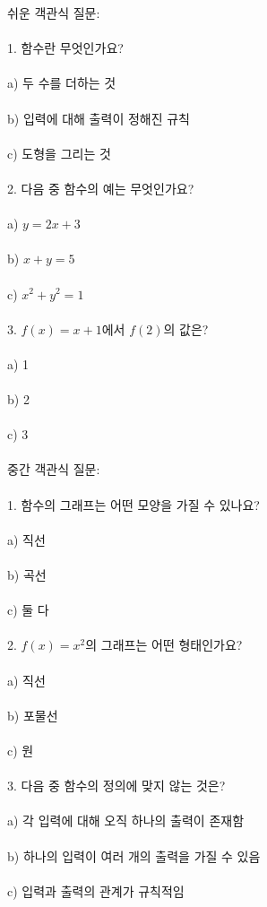\documentclass[fleqn]{article}
\begin{document}
      
      쉬운 객관식 질문: \\\\  
1. 함수란 무엇인가요? \\\\
   a) 두 수를 더하는 것 \\\\
   b) 입력에 대해 출력이 정해진 규칙 \\\\
   c) 도형을 그리는 것 \\\\

2. 다음 중 함수의 예는 무엇인가요? \\\\
   a) $y = 2x + 3$ \\\\
   b) $x + y = 5$ \\\\
   c) $x^2 + y^2 = 1$ \\\\

3. $f(x) = x + 1$에서 $f(2)$의 값은? \\\\
   a) 1 \\\\
   b) 2 \\\\
   c) 3 \\\\

중간 객관식 질문: \\\\  
1. 함수의 그래프는 어떤 모양을 가질 수 있나요? \\\\
   a) 직선 \\\\
   b) 곡선 \\\\
   c) 둘 다 \\\\

2. $f(x) = x^2$의 그래프는 어떤 형태인가요? \\\\
   a) 직선 \\\\
   b) 포물선 \\\\
   c) 원 \\\\

3. 다음 중 함수의 정의에 맞지 않는 것은? \\\\
   a) 각 입력에 대해 오직 하나의 출력이 존재함 \\\\
   b) 하나의 입력이 여러 개의 출력을 가질 수 있음 \\\\
   c) 입력과 출력의 관계가 규칙적임 \\\\
\end{document}
